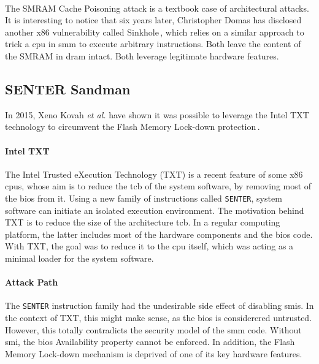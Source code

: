 \paragraph{}
%
The SMRAM Cache Poisoning attack is a textbook case of architectural attacks.
%
It is interesting to notice that six years later, Christopher Domas has
disclosed another x86 vulnerability called Sinkhole\,\cite{domas2015sinkhole},
which relies on a similar approach to trick a \ac{cpu} in \ac{smm} to execute
arbitrary instructions.
%
Both leave the content of the SMRAM in \ac{dram} intact.
%
Both leverage legitimate hardware features.

\subsection{SENTER Sandman}
\label{subsec:usecase:hse:sandman}

In 2015, Xeno Kovah \emph{et al.} have shown it was possible to leverage the
Intel TXT technology to circumvent the Flash Memory Lock-down
protection\,\cite{kovah2015senter}.

\paragraph{Intel TXT}
The Intel Trusted eXecution Technology (TXT) is a recent feature of some x86
\acp{cpu}, whose aim is to reduce the \ac{tcb} of the system software, by
removing most of the \ac{bios} from it.
%
Using a new family of instructions called \texttt{SENTER}, system software can
initiate an isolated execution environment.
%
The motivation behind TXT is to reduce the size of the architecture \ac{tcb}.
%
In a regular computing platform, the latter includes most of the hardware
components and the \ac{bios} code.
%
With TXT, the goal was to reduce it to the \ac{cpu} itself, which was acting as
a minimal loader for the system software.

\paragraph{Attack Path}
%
The \texttt{SENTER} instruction family had the undesirable side effect of
disabling \acp{smi}.
%
In the context of TXT, this might make sense, as the \ac{bios} is considerered
untrusted.
%
However, this totally contradicts the security model of the \ac{smm} code.
%
Without \ac{smi}, the \ac{bios} Availability property cannot be enforced.
%
In addition, the Flash Memory Lock-down mechanism is deprived of one of its key
hardware features.

